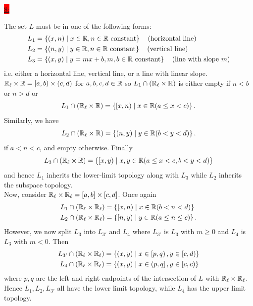 \documentclass{exam}
\begin{document}
\colorbox{red}{\underline{8:}}
\begin{solution}
    The set $L$ must be in one of the following forms:
    \begin{align*}
        L_1 &= \left\{(x, n) \mid x \in \mathbb R, n \in \mathbb R \text{ constant} \right\} \quad \text{(horizontal line)} \\
        L_2 &= \left\{(n, y) \mid y \in \mathbb R, n \in \mathbb R \text{ constant} \right\} \quad \text{(vertical line)} \\
        L_3 &= \left\{(x, y) \mid y = mx + b, m, b \in \mathbb R \text{ constant} \right\} \quad \text{(line with slope $m$)}
    \end{align*}
    i.e. either a horizontal line, vertical line, or a line with linear slope. $\mathbb R_{\ell} \times \mathbb R = \left[a, b\right) \times \left(c, d\right)$ for $a, b, c, d \in \mathbb R$ so $L_1 \cap \left(\mathbb R_{\ell} \times \mathbb R\right)$ is either empty if $n < b$ or $n > d$ or 
    \[
        L_1 \cap \left(\mathbb R_{\ell} \times \mathbb R\right) = \left\{\left[x, n\right) \mid x \in \mathbb R(a \leq x < c) \right\}.
    \]
    Similarly, we have 
    \[
        L_2 \cap \left(\mathbb R_{\ell} \times \mathbb R\right) = \left\{\left(n, y\right) \mid y \in \mathbb R(b < y < d) \right\}.
    \]
    if $a < n < c$, and empty otherwise. Finally 
    \[
        L_3 \cap \left(\mathbb R_{\ell} \times \mathbb R\right) = \left\{\left[x, y\right) \mid x, y \in \mathbb R(a \leq x < c, b < y < d) \right\} 
    \]
    and hence $L_1$ inherits the lower-limit topology along with $L_3$ while $L_2$ inherits the subspace topology. \\
    Now, consider $\mathbb R_{\ell} \times \mathbb R_{\ell} = \left[a, b\right] \times \left[c, d\right]$. Once again
    \begin{align*}
        L_1 \cap (\mathbb R_\ell \times \mathbb R_\ell) &= \left\{\left[x, n\right) \mid x \in \mathbb R(b < n < d) \right\} \\
        L_2 \cap (\mathbb R_\ell \times \mathbb R_\ell) &= \left\{\left[n, y \right) \mid y \in \mathbb R(a \leq n \leq c) \right\}.
    \end{align*}
    However, we now split $L_3$ into $L_{3'}$ and $L_4$ where $L_{3'}$ is $L_3$ with $m \geq 0$ and $L_4$ is $L_3$ with $m < 0$. Then 
    \begin{align*}
        L_{3'} \cap (\mathbb R_\ell \times \mathbb R_\ell) &= \left\{\left(x, y\right) \mid x \in \left[p, q\right), y \in \left[c, d\right) \right\} \\
        L_4 \cap (\mathbb R_\ell \times \mathbb R_\ell) &= \left\{\left(x, y \right) \mid x \in \left(p, q\right], y \in \left[c, c\right) \right\}
    \end{align*}
    where $p, q$ are the left and right endpoints of the intersection of $L$ with $\mathbb R_\ell \times \mathbb R_\ell$. Hence $L_{1}, L_{2}, L_{3'}$ all have the lower limit topology, while $L_4$ has the upper limit topology.
\end{solution}
\end{document}
